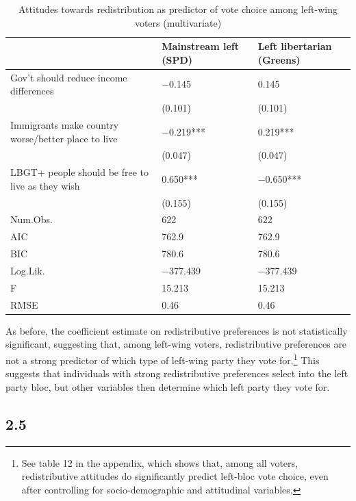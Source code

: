 \documentclass[
]{article}
\begin{document}
\begin{table}[!h]

\caption{\label{tab:left-wing-vot-comp-multi}Attitudes towards redistribution as predictor of vote choice among left-wing voters (multivariate)}
\centering
\begin{tabu} to 
\toprule
  & Mainstream left (SPD) & Left libertarian (Greens)\\
\midrule
Gov't should reduce income differences & \num{-0.145} & \num{0.145}\\
 & (\num{0.101}) & (\num{0.101})\\
Immigrants make country worse/better place to live & \num{-0.219}*** & \num{0.219}***\\
 & (\num{0.047}) & (\num{0.047})\\
LBGT+ people should be free to live as they wish & \num{0.650}*** & \num{-0.650}***\\
 & (\num{0.155}) & (\num{0.155})\\
\midrule
Num.Obs. & \num{622} & \num{622}\\
AIC & \num{762.9} & \num{762.9}\\
BIC & \num{780.6} & \num{780.6}\\
Log.Lik. & \num{-377.439} & \num{-377.439}\\
F & \num{15.213} & \num{15.213}\\
RMSE & \num{0.46} & \num{0.46}\\
\bottomrule
\end{tabu}
\end{table}

As before, the coefficient estimate on redistributive preferences is not
statistically significant, suggesting that, among left-wing voters,
redistributive preferences are not a strong predictor of which type of
left-wing party they vote for.\footnote{See table 12 in the appendix,
  which shows that, among all voters, redistributive attitudes do
  significantly predict left-bloc vote choice, even after controlling
  for socio-demographic and attitudinal variables.} This suggests that
individuals with strong redistributive preferences select into the left
party bloc, but other variables then determine which left party they
vote for.

\hypertarget{section-6}{%
\subsection{2.5}\label{section-6}}
\end{document}
